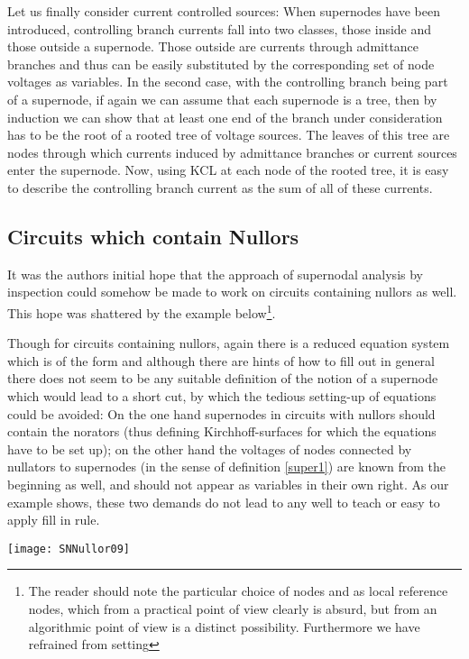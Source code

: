 \documentclass[10pt,journal,twocolumn,pagenumbers]{IEEEtran}
\begin{document}
Let us finally consider current controlled sources:
When super\-nodes have been introduced, controlling branch currents fall into two classes, those inside and those outside a supernode. Those outside are currents through admittance branches and thus can be easily substituted by the corresponding set of node voltages as variables. 
In the second case, with the controlling branch being part of a super\-node, if again we can assume that each supernode is a tree, then by induction we can show that at least one end of the branch under consideration has to be the root of a rooted tree of voltage sources. The leaves of this tree are nodes through which currents induced by admittance branches or current sources enter the supernode. Now, using KCL at each node of the rooted tree, it is easy to describe the controlling branch current as the sum of all of these currents.

\subsection{Circuits which contain Nullors}
It was the authors initial hope that the approach of supernodal analysis by inspection could somehow be made to work on circuits containing nullors as well. This hope was shattered by the example below\footnote{The reader should note the particular choice of nodes  and  as local reference nodes, which from a practical point of view clearly is absurd, but from an algorithmic point of view is a distinct possibility. Furthermore we have refrained from setting }.

Though for circuits containing nullors, again there is a reduced equation system which is of the form  and although there are hints of how to fill out
 in general there does not seem to be any suitable definition of the notion of a supernode which would lead to a short cut, by which the tedious setting-up of equations could be avoided: On the one hand super\-nodes in circuits with nullors should contain the norators (thus defining Kirchhoff-surfaces for which the equations have to be set up); on the other hand the voltages of nodes connected by nullators to supernodes (in the sense of definition \ref{super1}) are known from the beginning as well, and should not appear as variables in their own right. As our example shows, these two demands do not lead to any well to teach or easy to apply fill in rule.

\begin{center}
\vskip -0.2cm
{\texttt{[image: SNNullor09]}}
\vskip -0.5cm
\end{center}
\end{document}
